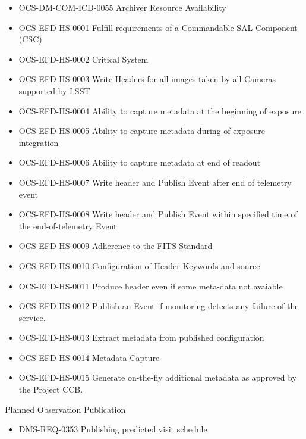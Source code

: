\begin{itemize}
\item OCS-DM-COM-ICD-0055 Archiver Resource Availability
\item OCS-EFD-HS-0001 Fulfill requirements of a Commandable SAL Component (CSC)
\item OCS-EFD-HS-0002 Critical System
\item OCS-EFD-HS-0003 Write Headers for all images taken by all Cameras supported by LSST
\item OCS-EFD-HS-0004 Ability to capture metadata at the beginning of exposure
\item OCS-EFD-HS-0005 Ability to capture metadata during of exposure integration
\item OCS-EFD-HS-0006 Ability to capture metadata at end of readout
\item OCS-EFD-HS-0007 Write header and Publish Event after end of telemetry event
\item OCS-EFD-HS-0008 Write header and Publish Event within specified time of the end-of-telemetry Event
\item OCS-EFD-HS-0009 Adherence to the FITS Standard
\item OCS-EFD-HS-0010 Configuration of Header Keywords and source
\item OCS-EFD-HS-0011 Produce header even if some meta-data not avaiable
\item OCS-EFD-HS-0012 Publish an Event if monitoring detects any failure of the service.
\item OCS-EFD-HS-0013 Extract metadata from published configuration
\item OCS-EFD-HS-0014 Metadata Capture
\item OCS-EFD-HS-0015 Generate on-the-fly additional metadata as approved by the Project CCB.
\end{itemize}
Planned Observation Publication \begin{itemize}
\item DMS-REQ-0353 Publishing predicted visit schedule
\end{itemize}

